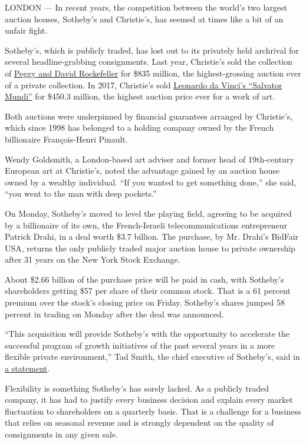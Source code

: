 LONDON --- In recent years, the competition between the world's two
largest auction houses, Sotheby's and Christie's, has seemed at times
like a bit of an unfair fight.

Sotheby's, which is publicly traded, has lost out to its privately held
archrival for several headline-grabbing consignments. Last year,
Christie's sold the collection of
\href{https://news.artnet.com/market/christies-rockefeller-record-first-half-1322264}{Peggy
and David Rockefeller} for \$835 million, the highest-grossing auction
ever of a private collection. In 2017, Christie's sold
\href{https://www.nytimes3xbfgragh.onion/2017/11/15/arts/design/leonardo-da-vinci-salvator-mundi-christies-auction.html}{Leonardo
da Vinci's ``Salvator Mundi''} for \$450.3 million, the highest auction
price ever for a work of art.

Both auctions were underpinned by financial guarantees arranged by
Christie's, which since 1998 has belonged to a holding company owned by
the French billionaire François-Henri Pinault.

Wendy Goldsmith, a London-based art adviser and former head of
19th-century European art at Christie's, noted the advantage gained by
an auction house owned by a wealthy individual. ``If you wanted to get
something done,'' she said, ``you went to the man with deep pockets.''

On Monday, Sotheby's moved to level the playing field, agreeing to be
acquired by a billionaire of its own, the French-Israeli
telecommunications entrepreneur Patrick Drahi, in a deal worth \$3.7
billion. The purchase, by Mr. Drahi's BidFair USA, returns the only
publicly traded major auction house to private ownership after 31 years
on the New York Stock Exchange.

About \$2.66 billion of the purchase price will be paid in cash, with
Sotheby's shareholders getting \$57 per share of their common stock.
That is a 61 percent premium over the stock's closing price on Friday.
Sotheby's shares jumped 58 percent in trading on Monday after the deal
was announced.

``This acquisition will provide Sotheby's with the opportunity to
accelerate the successful program of growth initiatives of the past
several years in a more flexible private environment,'' Tad Smith, the
chief executive of Sotheby's, said in
\href{https://www.prnewswire.com/news-releases/sothebys-announces-definitive-agreement-to-be-acquired-by-patrick-drahi-300869336.html}{a
statement}.

Flexibility is something Sotheby's has sorely lacked. As a publicly
traded company, it has had to justify every business decision and
explain every market fluctuation to shareholders on a quarterly basis.
That is a challenge for a business that relies on seasonal revenue and
is strongly dependent on the quality of consignments in any given sale.

